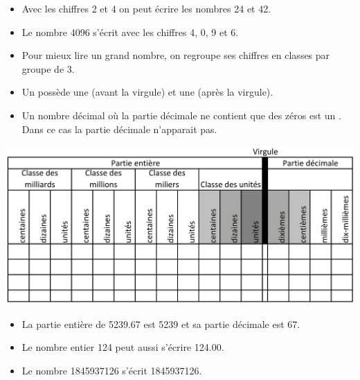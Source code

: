\begin{myexs}
	\begin{itemize}
		\item Avec les chiffres 2 et 4 on peut écrire les nombres 24 et 42.
		\item Le nombre \num{4096} s'écrit avec les chiffres 4, 0, 9 et 6.
		
	\end{itemize}
\end{myexs}





\begin{mydefs}
	\begin{itemize}
		\item Pour mieux lire un grand nombre, on regroupe ses chiffres en classes par groupe de 3.
		
		\item Un  possède une  (avant la virgule) et une  (après la virgule).
		
		\item Un nombre décimal où la partie décimale ne contient que des zéros est un . Dans ce cas la partie décimale n'apparait pas.
	\end{itemize}
\end{mydefs}

\begin{center}
	\includegraphics[scale=0.3]{img/tab_rangs}
\end{center}

\begin{myexs}
	\begin{itemize}
		\item La partie entière de \num{5239.67}  est \num{5239} et sa partie décimale est 67.	
		
		\item Le nombre entier \num{124} peut aussi s'écrire \num{124.00}.
		
		\item Le nombre 1845937126 s'écrit \num{1845937126}.
	\end{itemize}
\end{myexs}



